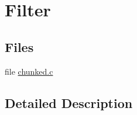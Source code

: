 \hypertarget{group__filter}{\section{Filter}
\label{group__filter}
}
\subsection*{Files}
\begin{DoxyCompactItemize}
\item 
file \hyperlink{chunked_8c}{chunked.\-c}
\end{DoxyCompactItemize}


\subsection{Detailed Description}

